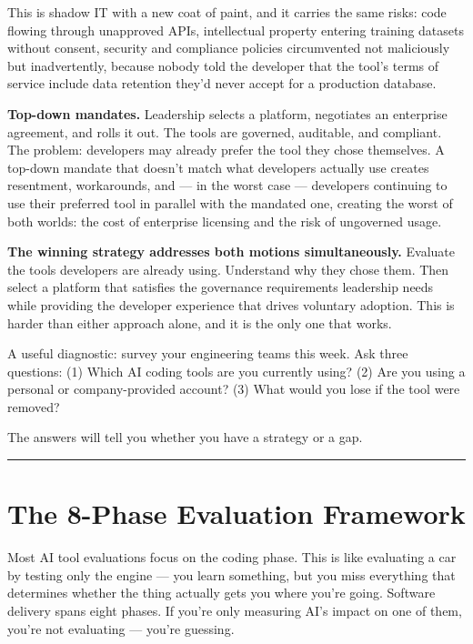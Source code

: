 \documentclass[
  a4paper,
  DIV=11,
  numbers=noendperiod]{scrreprt}
\begin{document}
This is shadow IT with a new coat of paint, and it carries the same
risks: code flowing through unapproved APIs, intellectual property
entering training datasets without consent, security and compliance
policies circumvented not maliciously but inadvertently, because nobody
told the developer that the tool's terms of service include data
retention they'd never accept for a production database.

\textbf{Top-down mandates.} Leadership selects a platform, negotiates an
enterprise agreement, and rolls it out. The tools are governed,
auditable, and compliant. The problem: developers may already prefer the
tool they chose themselves. A top-down mandate that doesn't match what
developers actually use creates resentment, workarounds, and --- in the
worst case --- developers continuing to use their preferred tool in
parallel with the mandated one, creating the worst of both worlds: the
cost of enterprise licensing and the risk of ungoverned usage.

\textbf{The winning strategy addresses both motions simultaneously.}
Evaluate the tools developers are already using. Understand why they
chose them. Then select a platform that satisfies the governance
requirements leadership needs while providing the developer experience
that drives voluntary adoption. This is harder than either approach
alone, and it is the only one that works.

A useful diagnostic: survey your engineering teams this week. Ask three
questions: (1) Which AI coding tools are you currently using? (2) Are
you using a personal or company-provided account? (3) What would you
lose if the tool were removed?

The answers will tell you whether you have a strategy or a gap.

\begin{center}\rule{0.5\linewidth}{0.5pt}\end{center}

\section{The 8-Phase Evaluation
Framework}\label{the-8-phase-evaluation-framework}

Most AI tool evaluations focus on the coding phase. This is like
evaluating a car by testing only the engine --- you learn something, but
you miss everything that determines whether the thing actually gets you
where you're going. Software delivery spans eight phases. If you're only
measuring AI's impact on one of them, you're not evaluating --- you're
guessing.
\end{document}
